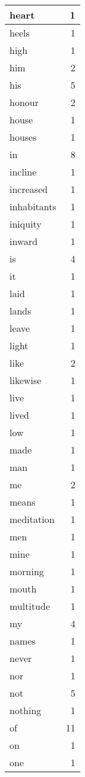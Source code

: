 \begin{center}
\begin{longtable}{l|r}
heart & 1 \\ \hline
heels & 1 \\ \hline
high & 1 \\ \hline
him & 2 \\ \hline
his & 5 \\ \hline
honour & 2 \\ \hline
house & 1 \\ \hline
houses & 1 \\ \hline
in & 8 \\ \hline
incline & 1 \\ \hline
increased & 1 \\ \hline
inhabitants & 1 \\ \hline
iniquity & 1 \\ \hline
inward & 1 \\ \hline
is & 4 \\ \hline
it & 1 \\ \hline
laid & 1 \\ \hline
lands & 1 \\ \hline
leave & 1 \\ \hline
light & 1 \\ \hline
like & 2 \\ \hline
likewise & 1 \\ \hline
live & 1 \\ \hline
lived & 1 \\ \hline
low & 1 \\ \hline
made & 1 \\ \hline
man & 1 \\ \hline
me & 2 \\ \hline
means & 1 \\ \hline
meditation & 1 \\ \hline
men & 1 \\ \hline
mine & 1 \\ \hline
morning & 1 \\ \hline
mouth & 1 \\ \hline
multitude & 1 \\ \hline
my & 4 \\ \hline
names & 1 \\ \hline
never & 1 \\ \hline
nor & 1 \\ \hline
not & 5 \\ \hline
nothing & 1 \\ \hline
of & 11 \\ \hline
on & 1 \\ \hline
one & 1 \\ \hline

\end{longtable}
\end{center}
